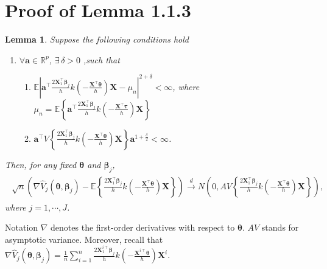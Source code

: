 \documentclass[12pt]{article}
\newcommand{\wh}{\widehat}
\newcommand{\itl}{\intercal}
\newcommand{\bs}{ \boldsymbol}
\newcommand{\mb}{\mathbb}
\newcommand{\lt}{\left}
\newcommand{\rt}{\right}
\newtheorem{lemma}[theorem]{Lemma}
\begin{document}
\section{Proof of Lemma 1.1.3}
\begin{lemma}
	Suppose the following conditions hold 
	\begin{enumerate}
		\item $\forall \bs{a} \in \mathbb{R}^p$, $\exists \,\delta > 0$ ,such that 
		\begin{enumerate}
			\item $\mathbb{E}\lt|\bs{a}^{\itl}\frac{2\bs{X}_{1}^{\itl}\bs{\beta}_j}{h}k\lt(-\frac{\bs{X}^{\itl}\bs{\theta}}{h}\rt)\bs{X}-\mu_{n}\rt|^{2+\delta} < \infty$, where $\mu_{n}=\mathbb{E}\lt\{\bs{a^{\itl}}\frac{2\bs{X}_{1}^{\itl}\bs{\beta}_{j}}{h}k\lt(-\frac{\bs{X}^{\itl}\bs{\tau}}{h}\rt)\bs{X}\rt\}$
			\item $\bs{\bs{a}^{\itl}}V\lt\{\frac{2\bs{X}^{\itl}_{1}\bs{\beta}_j}{h}k(-\frac{\bs{X}^{\itl}\bs{\theta}}{h})\bs{X}\rt\}\bs{a} ^{1+\frac{\delta}{2}}< \infty$.
		\end{enumerate}
	\end{enumerate} 
	Then, for any fixed $\bs{\theta}$ and $\bs{\beta}_j$,
	\begin{gather}
	\begin{flalign*}
	\sqrt{n}\lt(\nabla\wh{V}_j\lt(\bs{\theta}, \bs{\beta}_j\rt) -  \mb{E} \lt\{\frac{2\bs{X}_{1}^{\itl}\bs{\beta}_{j}}{h}k\lt(-\frac{\bs{X}^{\itl}\bs{\theta}}{h}\rt)\bs{X}\rt\}\rt)\overset{d}{\to}N\lt(0,AV\lt\{\frac{2\bs{X}_1^{\itl}\bs{\beta}_j}{h}k\lt(-\frac{\bs{X}^{\itl}\bs{\theta}}{h}\rt)\bs{X}\rt\}\rt),
	\end{flalign*}
	\end{gather}
	where $j = 1, \cdots, J$.
\end{lemma}
Notation $\nabla$ denotes the first-order derivatives with respect to $\bs{\theta}$. $AV$ stands for asymptotic variance. Moreover, recall that $\nabla\wh{V}_j\lt(\bs{\theta}, \bs{\beta}_j\rt)=\frac{1}{n}\sum_{i=1}^{n}\frac{2\bs{X}_{1}^{i\itl}\bs{\beta}_{j}}{h}k\lt(-\frac{\bs{X}^{i\itl}\bs{\theta}}{h}\rt)\bs{X}^{i}$.
\end{document}

